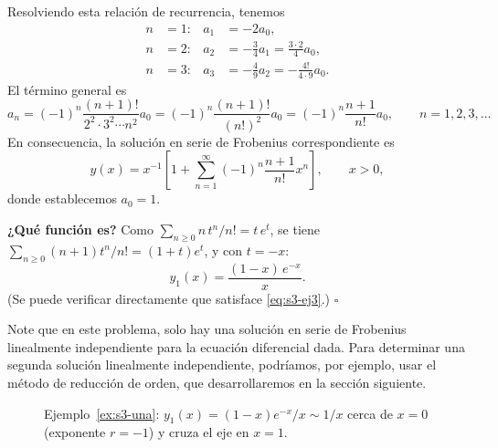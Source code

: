 \begin{example}
Resolviendo esta relación de recurrencia, tenemos
\begin{align*}
n &= 1: & a_1 &= -2a_0, \\
n &= 2: & a_2 &= -\frac{3}{4}a_1 = \frac{3 \cdot 2}{4}a_0, \\
n &= 3: & a_3 &= -\frac{4}{9}a_2 = -\frac{4!}{4 \cdot 9}a_0.
\end{align*}
El término general es
\[ a_n = (-1)^n \frac{(n + 1)!}{2^2 \cdot 3^2 \cdots n^2}a_0 = (-1)^n \frac{(n + 1)!}{(n!)^2}a_0 = (-1)^n \frac{n + 1}{n!}a_0, \qquad n = 1, 2, 3, \dots \]
En consecuencia, la solución en serie de Frobenius correspondiente es
\[ y(x) = x^{-1} \left[ 1 + \sum_{n=1}^{\infty} (-1)^n \frac{n + 1}{n!} x^n \right], \qquad x > 0, \]
donde establecemos $a_0 = 1$.
 
\vspace{.15cm}
\noindent\textbf{¿Qué función es?} Como $\sum_{n\ge0} n\,t^n/n!=t\,e^t$, se tiene $\sum_{n\ge0}(n+1)t^n/n!=(1+t)e^t$, y con $t=-x$:
\[ y_1(x)=\frac{(1-x)\,e^{-x}}{x}. \]
(Se puede verificar directamente que satisface \eqref{eq:s3-ej3}.) \hfill $\square$
 
Note que en este problema, solo hay una solución en serie de Frobenius linealmente independiente para la ecuación diferencial dada. Para determinar una segunda solución linealmente independiente, podríamos, por ejemplo, usar el método de reducción de orden, que desarrollaremos en la sección siguiente.
\end{example}
 
\begin{figure}[H]
\centering
{}
\caption{Ejemplo~\ref{ex:s3-una}: $y_1(x)=(1-x)e^{-x}/x\sim 1/x$ cerca de $x=0$ (exponente $r=-1$) y cruza el eje en $x=1$.}
\label{fig:s3-una}
\end{figure}
 
